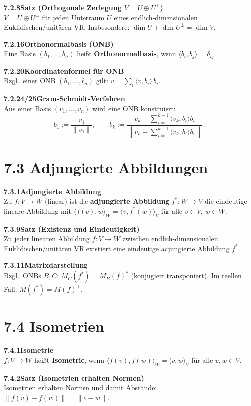 \documentclass[a4paper,12pt]{article}
\newcommand{\gentry}[3]{%
  \noindent\textbf{#1\quad #2}\nopagebreak\\[0.2em]
  #3\par\smallskip
}
\begin{document}
\gentry{7.2.8}{Satz (Orthogonale Zerlegung $V = U \oplus U^\perp$)}{%
  $V = U \oplus U^\perp$ für jeden Unterraum $U$ eines endlich-dimensionalen Euklidischen/unitären VR.
  Insbesondere: $\dim U + \dim U^\perp = \dim V$.
}

\gentry{7.2.16}{Orthonormalbasis (ONB)}{%
  Eine Basis $(b_1,\ldots,b_n)$ heißt \textbf{Orthonormalbasis}, wenn $\langle b_i, b_j\rangle = \delta_{ij}$.
}

\gentry{7.2.20}{Koordinatenformel für ONB}{%
  Bzgl.\ einer ONB $(b_1,\ldots,b_n)$ gilt: $v = \sum_i \langle v, b_i\rangle \, b_i$.
}

\gentry{7.2.24/25}{Gram-Schmidt-Verfahren}{%
  Aus einer Basis $(v_1,\ldots,v_n)$ wird eine ONB konstruiert:
  \[
    b_1 := \frac{v_1}{\|v_1\|}, \qquad
    b_k := \frac{v_k - \sum_{i=1}^{k-1}\langle v_k, b_i\rangle b_i}{\left\|v_k - \sum_{i=1}^{k-1}\langle v_k, b_i\rangle b_i\right\|}.
  \]
}

\section*{7.3 \quad Adjungierte Abbildungen}

\gentry{7.3.1}{Adjungierte Abbildung}{%
  Zu $f: V \to W$ (linear) ist die \textbf{adjungierte Abbildung} $f^*: W \to V$ die eindeutige lineare Abbildung mit
  $\langle f(v), w\rangle_W = \langle v, f^*(w)\rangle_V$ für alle $v \in V$, $w \in W$.
}

\gentry{7.3.9}{Satz (Existenz und Eindeutigkeit)}{%
  Zu jeder linearen Abbildung $f: V \to W$ zwischen endlich-dimensionalen Euklidischen/unitären VR existiert eine eindeutige adjungierte Abbildung $f^*$.
}

\gentry{7.3.11}{Matrixdarstellung}{%
  Bzgl.\ ONBs $B, C$: $M_C(f^*) = M_B(f)^*$ (konjugiert transponiert).
  Im reellen Fall: $M(f^*) = M(f)^\top$.
}

\section*{7.4 \quad Isometrien}

\gentry{7.4.1}{Isometrie}{%
  $f: V \to W$ heißt \textbf{Isometrie}, wenn $\langle f(v), f(w)\rangle_W = \langle v, w\rangle_V$ für alle $v, w \in V$.
}

\gentry{7.4.2}{Satz (Isometrien erhalten Normen)}{Isometrien erhalten Normen und damit Abstände: $\|f(v) - f(w)\| = \|v - w\|$.}
\end{document}
